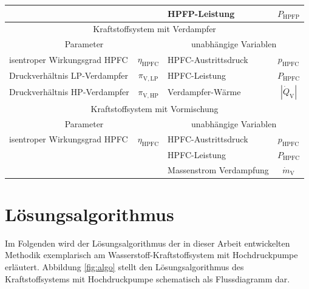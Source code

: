 \begin{table}[ht]
\begin{tabular} {|l|c|l|c|}
    & & HPFP-Leistung & $P_{\mathrm{HPFP}}$ \\ \hline\hline
    \multicolumn{4}{|c|}{Kraftstoffsystem mit Verdampfer}\\ \hline
    \multicolumn{2}{|c}{Parameter} & \multicolumn{2}{|c|}{unabhängige Variablen}\\ \hline\hline%
    isentroper Wirkungsgrad HPFC & $\eta_{\mathrm{HPFC}}$ & HPFC-Austrittsdruck & $p_{\mathrm{HPFC}}$ \\ \hline
    Druckverhältnis LP-Verdampfer & $\pi_{\mathrm{V,LP}}$ & HPFC-Leistung & $P_{\mathrm{HPFC}}$ \\ \hline
    Druckverhältnis HP-Verdampfer & $\pi_\mathrm{V,HP}$ & Verdampfer-Wärme & $|\dot{Q}_\mathrm{V}|$ \\ \hline\hline
    \multicolumn{4}{|c|}{Kraftstoffsystem mit Vormischung}\\ \hline
    \multicolumn{2}{|c}{Parameter} & \multicolumn{2}{|c|}{unabhängige Variablen}\\ \hline\hline%
    isentroper Wirkungsgrad HPFC & $\eta_{\mathrm{HPFC}}$ & HPFC-Austrittsdruck & $p_{\mathrm{HPFC}}$ \\ \hline
    \multicolumn{2}{|c|}{}& HPFC-Leistung & $P_{\mathrm{HPFC}}$ \\ \hline
    \multicolumn{2}{|c|}{}& Massenstrom Verdampfung & $\dot{m}_\mathrm{V}$ \\ \hline
    \end{tabular}	
    \label{Tab:h2_params}%
\end{table}
\FloatBarrier 


\section{Lösungsalgorithmus}

Im Folgenden wird der Lösungsalgorithmus der in dieser Arbeit entwickelten Methodik exemplarisch am Wasserstoff-Kraftstoffsystem mit Hochdruckpumpe erläutert. Abbildung \ref{fig:algo} stellt den Lösungsalgorithmus des Kraftstoffsystems mit Hochdruckpumpe schematisch als Flussdiagramm dar.

